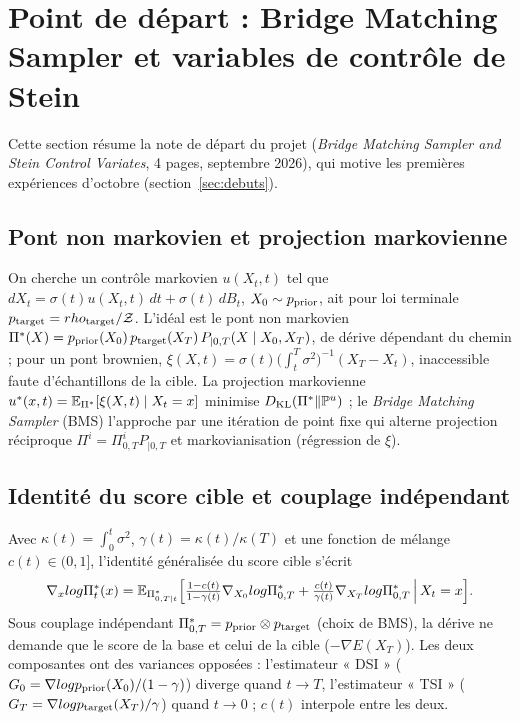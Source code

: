 \section{Point de départ : Bridge Matching Sampler et variables de contrôle de Stein}
\label{sec:bms}

Cette section résume la note de départ du projet (\emph{Bridge Matching Sampler and Stein Control Variates}, 4 pages, septembre 2026), qui motive les premières expériences d'octobre (section~\ref{sec:debuts}).

\subsection{Pont non markovien et projection markovienne}
On cherche un contrôle markovien $u(X_t,t)$ tel que $dX_t=\sigma(t)u(X_t,t)\,dt+\sigma(t)\,dB_t$, $X_0\sim p_{\rm prior}$, ait pour loi terminale $p_{\rm target}=\rho_{\rm target}/\mathcal Z$. L'idéal est le pont non markovien $\Pi^*(X)=p_{\rm prior}(X_0)\,p_{\rm target}(X_T)\,P_{|0,T}(X\mid X_0,X_T)$, de dérive dépendant du chemin ; pour un pont brownien, $\xi(X,t)=\sigma(t)\big(\int_t^T\sigma^2\big)^{-1}(X_T-X_t)$, inaccessible faute d'échantillons de la cible. La projection markovienne $u^*(x,t)=\E_{\Pi^*}[\xi(X,t)\mid X_t=x]$ minimise $D_{\rm KL}(\Pi^*\|\mathbb P^u)$ ; le \emph{Bridge Matching Sampler} (BMS) l'approche par une itération de point fixe qui alterne projection réciproque $\Pi^i=\Pi^i_{0,T}P_{|0,T}$ et markovianisation (régression de $\xi$).

\subsection{Identité du score cible et couplage indépendant}
Avec $\kappa(t)=\int_0^t\sigma^2$, $\gamma(t)=\kappa(t)/\kappa(T)$ et une fonction de mélange $c(t)\in(0,1]$, l'identité généralisée du score cible s'écrit
\[
\nabla_x\log\Pi^*_t(x)=\E_{\Pi^*_{0,T|t}}\Big[\tfrac{1-c(t)}{1-\gamma(t)}\nabla_{X_0}\log\Pi^*_{0,T}+\tfrac{c(t)}{\gamma(t)}\nabla_{X_T}\log\Pi^*_{0,T}\,\Big|\,X_t=x\Big].
\]
Sous couplage indépendant $\Pi^*_{0,T}=p_{\rm prior}\otimes p_{\rm target}$ (choix de BMS), la dérive ne demande que le score de la base et celui de la cible ($-\nabla E(X_T)$). Les deux composantes ont des variances opposées : l'estimateur « DSI » ($G_0=\nabla\log p_{\rm prior}(X_0)/(1-\gamma)$) diverge quand $t\to T$, l'estimateur « TSI » ($G_T=\nabla\log p_{\rm target}(X_T)/\gamma$) quand $t\to0$ ; $c(t)$ interpole entre les deux.

